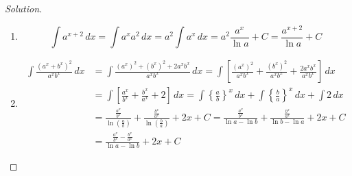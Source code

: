 \documentclass{book}
\theoremstyle{definition}
\newenvironment{solution}
    {\begin{proof}[Solution]}
    {\end{proof}}
\begin{document}
\begin{solution}
\begin{enumerate}[label=(\roman*)]
\item 
\[
\int a^{x+2} \, dx = \int a^xa^2 \, dx = a^2\int a^x \, dx = a^2\frac{a^x}{\ln a}+C=\frac{a^{x+2}}{\ln a}+C
\]

\item 
\begin{align*}
\int \frac{(a^x+b^x)^2}{a^xb^x} \, dx &= \int \frac{(a^x)^2+(b^x)^2+2a^xb^x}{a^xb^x} \, dx = \int\left[\frac{(a^x)^2}{a^xb^x}+\frac{(b^x)^2}{a^xb^x}+\frac{2a^xb^x}{a^xb^x}\right] \, dx \\
&= \int \left[\frac{a^x}{b^x}+\frac{b^x}{a^x}+2\right] \, dx = \int \left\{\frac{a}{b}\right\}^x \, dx+\int \left\{\frac{b}{a}\right\}^x \, dx+\int 2\,dx \\
&= \frac{\frac{a^x}{b^x}}{\ln(\frac{a}{b})}+\frac{\frac{b^x}{a^x}}{\ln(\frac{b}{a})}+2x+C = \frac{\frac{a^x}{b^x}}{\ln a - \ln b}+\frac{\frac{b^x}{a^x}}{\ln b - \ln a}+2x+C \\
&= \frac{\frac{a^x}{b^x}-\frac{b^x}{a^x}}{\ln a - \ln b} + 2x + C
\end{align*}



\end{enumerate}
\end{solution}
\end{document}
